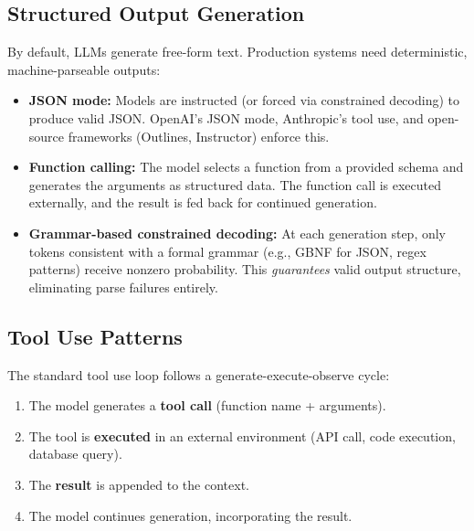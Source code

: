 \subsection{Structured Output Generation}

By default, LLMs generate free-form text.  Production systems need
deterministic, machine-parseable outputs:

\begin{itemize}[leftmargin=*]
\item \textbf{JSON mode:} Models are instructed (or forced via constrained
  decoding) to produce valid JSON.  OpenAI's JSON mode, Anthropic's tool use,
  and open-source frameworks (Outlines, Instructor) enforce this.

\item \textbf{Function calling:} The model selects a function from a provided
  schema and generates the arguments as structured data.  The function call
  is executed externally, and the result is fed back for continued generation.

\item \textbf{Grammar-based constrained decoding:} At each generation step,
  only tokens consistent with a formal grammar (e.g., GBNF for JSON, regex
  patterns) receive nonzero probability.  This \emph{guarantees} valid output
  structure, eliminating parse failures entirely.
\end{itemize}

\subsection{Tool Use Patterns}

The standard tool use loop follows a generate-execute-observe cycle:

\begin{enumerate}[leftmargin=*]
\item The model generates a \textbf{tool call} (function name + arguments).
\item The tool is \textbf{executed} in an external environment (API call,
  code execution, database query).
\item The \textbf{result} is appended to the context.
\item The model continues generation, incorporating the result.
\end{enumerate}

